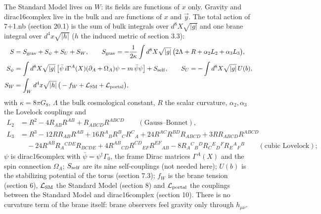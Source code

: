 \documentclass[10pt,a4paper]{article}
\begin{document}
The Standard Model lives on $W$: its fields are functions of $x$ only. Gravity and dirac16complex live in the bulk and are functions of $x$ and $\vec y$. The total action of 7+1.nb (section 20.1) is the sum of bulk integrals over $d^8X\sqrt{|g|}$ and one brane integral over $d^4x\sqrt{|h|}$ ($h$ the induced metric of section 3.3):
\begin{align*}
S&=S_{\rm grav}+S_\psi+S_U+S_W,\qquad S_{\rm grav}=-\frac1{2\kappa}\int d^8X\sqrt{|g|}\,\big(2\Lambda+R+\alpha_2L_2+\alpha_3L_3\big), \\
S_\psi&=\int d^8X\sqrt{|g|}\,\big[\bar\psi\,i\Gamma^A(X)(\partial_A+\Omega_A)\psi-m\,\bar\psi\psi\big]+S_{\rm self},\qquad S_U=-\int d^8X\sqrt{|g|}\,U(b), \\
S_W&=\int_Wd^4x\sqrt{|h|}\,\big(-f_W+\mathcal L_{\rm SM}+\mathcal L_{\rm portal}\big),
\end{align*}
with $\kappa=8\pi G_8$, $\Lambda$ the bulk cosmological constant, $R$ the scalar curvature, $\alpha_2,\alpha_3$ the Lovelock couplings and
\begin{align*}
L_2&=R^2-4R_{AB}R^{AB}+R_{ABCD}R^{ABCD}\qquad(\text{Gauss–Bonnet}), \\
L_3&=R^3-12RR_{AB}R^{AB}+16R^A{}_BR^B{}_CR^C{}_A+24R^{AC}R^{BD}R_{ABCD}+3RR_{ABCD}R^{ABCD} \\
&\quad-24R^{AB}R_A{}^{CDE}R_{BCDE}+4R^{AB}{}_{CD}R^{CD}{}_{EF}R^{EF}{}_{AB}-8R_A{}^C{}_B{}^DR_C{}^E{}_D{}^FR_E{}^A{}_F{}^B\qquad(\text{cubic Lovelock});
\end{align*}
$\psi$ is dirac16complex with $\bar\psi=\psi^\dagger\Gamma_0$, the frame Dirac matrices $\Gamma^A(X)$ and the spin connection $\Omega_A$; $S_{\rm self}$ are its nine self-couplings (not needed here); $U(b)$ is the stabilizing potential of the torus (section 7.3); $f_W$ is the brane tension (section 6), $\mathcal L_{\rm SM}$ the Standard Model (section 8) and $\mathcal L_{\rm portal}$ the couplings between the Standard Model and dirac16complex (section 10). There is no curvature term of the brane itself: brane observers feel gravity only through $h_{\mu\nu}$.
\end{document}
